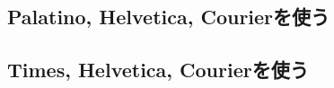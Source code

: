 \begin{intext}
\usepackage[scaled]{helvet} %
\end{intext}




\subsection{Palatino, Helvetica, Courierを使う}

\begin{inonly}
\usepackage{mathpazo}%
\usepackage[scaled]{helvet}%
\usepackage{courier}%
\end{inonly} 


\subsection{Times, Helvetica, Courierを使う}
\begin{inonly}
\usepackage{mathptmx}%
\usepackage[scaled]{helvet}%
\usepackage{courier}%
\end{inonly}




\newcommand*\mathimage[2][clip]{%
  \noindent%
    {\texttt{[image: mathFontTest/smpl-\#2-crop]}}%
}%
%

